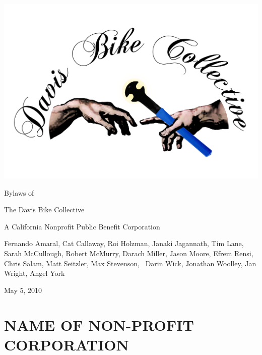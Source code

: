 \documentclass[letterpaper,titlepage]{article}
\begin{document}

\setcounter{page}{1}

\begin{titlepage}
	\begin{center}
        \includegraphics[width=\columnwidth]{logo.png}
		\vspace*{0.5in}
        \begin{LARGE}
            Bylaws of
        \end{LARGE}
		\vskip 0.25in
		\begin{Huge}
            The Davis Bike Collective
		\end{Huge}
		\vskip 0.25in
        \begin{LARGE}
            A California Nonprofit Public Benefit Corporation
        \end{LARGE}
		\vskip 0.5in
		\begin{large}
            Fernando Amaral, Cat Callaway, Roi Holzman, Janaki Jagannath, Tim
            Lane, Sarah McCullough, Robert McMurry, Darach Miller, Jason Moore,
            Efrem Rensi, Chris Salam, Matt Seitzler, Max Stevenson,  Darin
            Wick, Jonathan Woolley, Jan Wright, Angel York
        \end{large}
        \vskip 0.25in
        \begin{LARGE}
            May 5, 2010
		\end{LARGE}
	\end{center}
	\vfill
\end{titlepage}

\tableofcontents
\newpage
\listofdefn
\newpage
{}
\setcounter{page}{1}
\section{NAME OF NON-PROFIT CORPORATION}
\label{sec:name}
\end{document}
